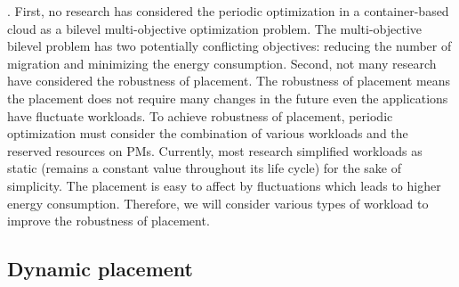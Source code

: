 . 
First, no research has considered the periodic optimization in a container-based cloud as a bilevel multi-objective optimization problem. The multi-objective bilevel problem has two potentially conflicting objectives: reducing the number of migration and minimizing the energy consumption.
Second, not many research have considered the robustness of placement. The robustness of placement means the placement does not require many changes in the future even the applications have fluctuate workloads. To achieve robustness of placement, periodic optimization must consider the combination of various workloads and the reserved resources on PMs. Currently, most research simplified workloads as static (remains a constant value throughout its life cycle) \cite{Viswanathan:2012ej, Chen:2011fl,Feller:2011vs} for the sake of simplicity. The placement is easy to affect by fluctuations which leads to higher energy consumption. Therefore, we will consider various types of workload to improve the robustness of placement.







\subsection{Dynamic placement}


